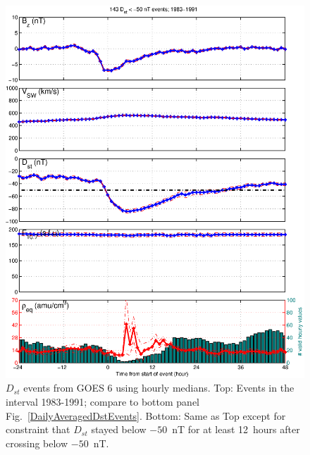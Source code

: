\documentclass[10pt,twocolumn]{article}
\begin{document}
\begin{figure}[tp!]
\includegraphics[scale=0.40]{figures/stormavs-dd12-GOES6.eps}
\caption{$D_{st}$ events from GOES 6 using hourly medians. Top: Events in the interval 1983-1991; compare to bottom panel Fig.~\ref{DailyAveragedDstEvents}. Bottom: Same as Top except for constraint that $D_{st}$ stayed below $-50$~nT for at least 12~hours after crossing below $-50$~nT.}
\label{HourlyAveragedDstEvents}
\end{figure}

\clearpage
\end{document}
